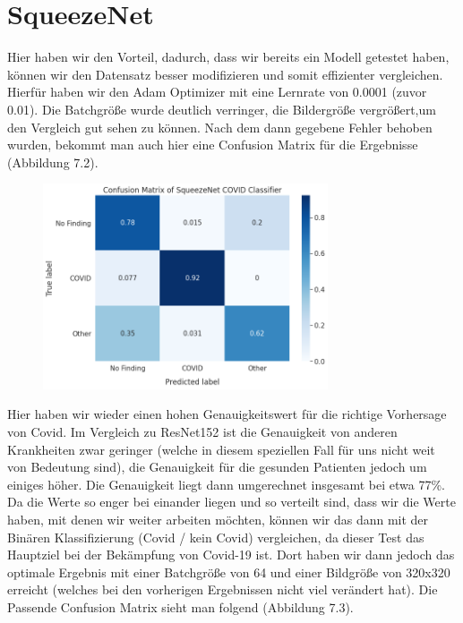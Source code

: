 \section{SqueezeNet}

Hier haben wir den Vorteil, dadurch, dass wir bereits ein Modell getestet haben, können wir den Datensatz besser modifizieren und somit effizienter vergleichen.
Hierfür haben wir den Adam Optimizer mit eine Lernrate von 0.0001 (zuvor 0.01). Die Batchgröße wurde deutlich verringer, die Bildergröße vergrößert,um den Vergleich gut sehen zu können. Nach dem dann gegebene Fehler behoben wurden, bekommt man auch hier eine Confusion Matrix für die Ergebnisse (Abbildung 7.2).

\begin{figure}[H]
    \centering
    \includegraphics[width=0.75\textwidth]{../results/SqueezeNet_conf_matrix.png}
    \caption{}
\end{figure}

Hier haben wir wieder einen hohen Genauigkeitswert für die richtige Vorhersage von Covid. Im Vergleich zu ResNet152 ist die Genauigkeit von anderen Krankheiten zwar geringer (welche in diesem speziellen Fall für uns nicht weit von Bedeutung sind), die Genauigkeit für die gesunden Patienten jedoch um einiges höher. Die Genauigkeit liegt dann umgerechnet insgesamt bei etwa 77\%. Da die Werte so enger bei einander liegen und so verteilt sind, dass wir die Werte haben, mit denen wir weiter arbeiten möchten, können wir das dann mit der Binären Klassifizierung (Covid / kein Covid) vergleichen, da dieser Test das Hauptziel bei der Bekämpfung von Covid-19 ist. Dort haben wir dann jedoch das optimale Ergebnis mit einer Batchgröße von 64 und einer Bildgröße von 320x320 erreicht (welches bei den vorherigen Ergebnissen nicht viel verändert hat). Die Passende Confusion Matrix sieht man folgend (Abbildung 7.3).

